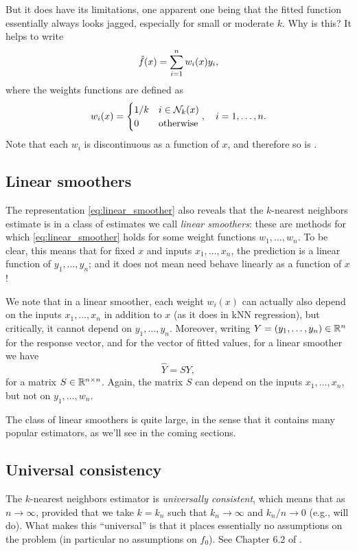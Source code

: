 \documentclass{article}
\begin{document}
But it does have its limitations, one apparent one being that the fitted
function \smash{$\hf$} essentially always looks jagged, especially for small or
moderate $k$. Why is this?  It helps to write 
\begin{equation}
\label{eq:linear_smoother}
\hat{f}(x) = \sum_{i=1}^n w_i(x) y_i,
\end{equation}
where the weights functions are defined as
\[
w_i(x) = \begin{cases}
1/k & i \in \mathcal{N}_k(x) \\ 
0 & \text{otherwise}
\end{cases}, \quad i=1,\dots,n.
\]
Note that each $w_i$ is discontinuous as a function of $x$, and therefore so is 
\smash{$\hf$}.

\subsection{Linear smoothers}

The representation \eqref{eq:linear_smoother} also reveals that the $k$-nearest
neighbors estimate is in a class of estimates we call \emph{linear smoothers}:
these are methods for which \eqref{eq:linear_smoother} holds for some weight
functions $w_1,\dots,w_n$. To be clear, this means that for fixed $x$ and inputs
$x_1,\dots,x_n$, the prediction  is a linear function of
$y_1,\dots,y_n$; and it does not mean \smash{$\hf$} need behave linearly as a
function of $x$!  

We note that in a linear smoother, each weight $w_i(x)$ can actually also depend
on the inputs $x_1,\dots,x_n$ in addition to $x$ (as it does in kNN regression),
but critically, it cannot depend on $y_1,\dots,y_n$. Moreover, writing $Y =
(y_1,\dots,y_n) \in \mathbb{R}^n$ for the response vector, and  for the vector of fitted values, for a
linear smoother we have 
\[
\hat{Y} = S Y,
\]
for a matrix $S \in \mathbb{R}^{n \times n}$. Again, the matrix $S$ can depend on the
inputs $x_1,\dots,x_n$, but not on $y_1,\dots,w_n$. 

The class of linear smoothers is quite large, in the sense that it contains many
popular estimators, as we'll see in the coming sections.

\subsection{Universal consistency}

The $k$-nearest neighbors estimator is \emph{universally consistent}, which
means that  as $n \to \infty$, provided that we
take $k=k_n$ such that $k_n \to \infty$ and $k_n/n \to 0$ (e.g.,
 will do). What makes this ``universal'' is that it places
essentially no assumptions on the problem (in particular no assumptions on
$f_0$). See Chapter 6.2 of \citet{gyorfi2002distribution}. 
\end{document}
